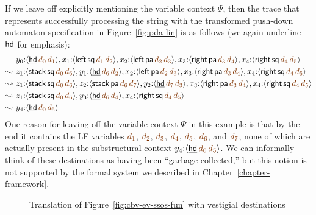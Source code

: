 If we leave off explicitly mentioning the variable context $\Psi$, 
then the trace that represents successfully processing 
the string {\sf [ ( ) ] }
with the transformed push-down automaton 
specification in Figure~\ref{fig:pda-lin} 
is as follows (we again underline ${\sf hd}$
for emphasis):
\begin{align*}
           & y_0{:}\susp{\underline{\sf hd}\,\lf{d_0}\,\lf{d_1}},
             x_1{:}\susp{{\sf left}\,{\sf sq}\,\lf{d_1}\,\lf{d_2}},
             x_2{:}\susp{{\sf left}\,{\sf pa}\,\lf{d_2}\,\lf{d_3}},
             x_3{:}\susp{{\sf right}\,{\sf pa}\,\lf{d_3}\,\lf{d_4}},
             x_4{:}\susp{{\sf right}\,{\sf sq}\,\lf{d_4}\,\lf{d_5}}
\\
\leadsto ~ & z_1{:}\susp{{\sf stack}\,{\sf sq}\,\lf{d_0}\,\lf{d_6}},
             y_1{:}\susp{\underline{\sf hd}\,\lf{d_6}\,\lf{d_2}},
             x_2{:}\susp{{\sf left}\,{\sf pa}\,\lf{d_2}\,\lf{d_3}},
             x_3{:}\susp{{\sf right}\,{\sf pa}\,\lf{d_3}\,\lf{d_4}},
             x_4{:}\susp{{\sf right}\,{\sf sq}\,\lf{d_4}\,\lf{d_5}}
\\
\leadsto ~ & z_1{:}\susp{{\sf stack}\,{\sf sq}\,\lf{d_0}\,\lf{d_6}},
             z_2{:}\susp{{\sf stack}\,{\sf pa}\,\lf{d_6}\,\lf{d_7}},
             y_2{:}\susp{\underline{\sf hd}\,\lf{d_7}\,\lf{d_3}},
             x_3{:}\susp{{\sf right}\,{\sf pa}\,\lf{d_3}\,\lf{d_4}},
             x_4{:}\susp{{\sf right}\,{\sf sq}\,\lf{d_4}\,\lf{d_5}}
\\
\leadsto ~ & z_1{:}\susp{{\sf stack}\,{\sf sq}\,\lf{d_0}\,\lf{d_6}},
             y_3{:}\susp{\underline{\sf hd}\,\lf{d_6}\,\lf{d_4}},
             x_4{:}\susp{{\sf right}\,{\sf sq}\,\lf{d_4}\,\lf{d_5}}
\\
\leadsto ~ & y_4{:}\susp{\underline{\sf hd}\,\lf{d_0}\,\lf{d_5}}
\end{align*}
One reason for leaving off the variable context $\Psi$ in this example
is that by the end it contains the LF variables $\lf{d_1}$,
$\lf{d_2}$, $\lf{d_3}$, $\lf{d_4}$, $\lf{d_5}$, $\lf{d_6}$, and
$\lf{d_7}$, none of which are actually present in the substructural
context $y_4{:}\susp{\underline{\sf hd}\,\lf{d_0}\,\lf{d_5}}$. We can
informally think of these destinations as having been ``garbage
collected,'' but this notion is not supported by the formal system we
described in Chapter~\ref{chapter-framework}.


\begin{figure}[t]
\caption{Translation of Figure~\ref{fig:cbv-ev-ssos-fun} with vestigial destinations}
\label{fig:dest-vestige}
\end{figure}

